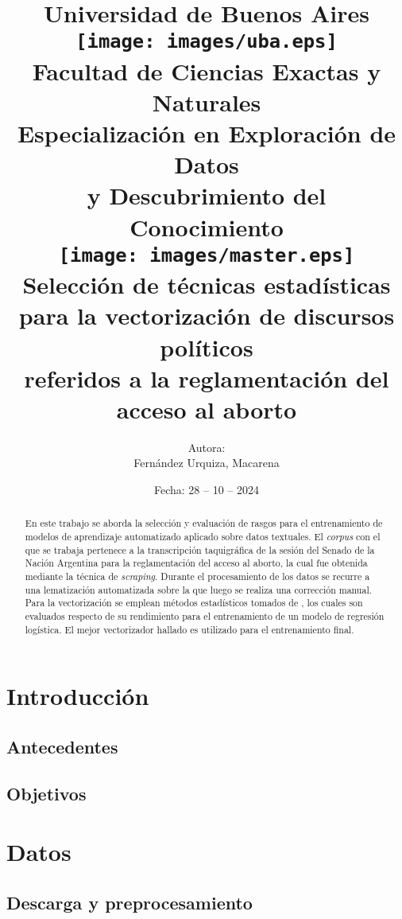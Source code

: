 \documentclass[colorinlistoftodos]{article}
\title{
    {\large Universidad de Buenos Aires\vspace{20pt}}\\
    {\texttt{[image: images/uba.eps]}}\\
    {\large\textbf{Facultad de Ciencias Exactas y Naturales}}\vspace{16pt}\\
    {\small\textbf{Especializaci\'on en Exploraci\'on de Datos\\y Descubrimiento del Conocimiento}\vspace{16pt}}\\
    {\texttt{[image: images/master.eps]}}\\
    {
        Selecci\'on de t\'ecnicas estad\'isticas\\
        para la vectorizaci\'on de discursos pol\'iticos\\
        referidos a la reglamentaci\'on del acceso al aborto
    }
}
\author{Autora:\\Fern\'andez Urquiza, Macarena}
\date{Fecha: 28 -- 10 -- 2024}
\begin{document}
\clearpage\maketitle
\thispagestyle{empty}

\newpage
\tableofcontents

\newpage

\begin{abstract}
En este trabajo se aborda la selecci\'on y evaluaci\'on de rasgos para el
entrenamiento de modelos de aprendizaje automatizado aplicado sobre datos textuales.
El \textit{corpus} con el que se trabaja pertenece a la transcripci\'on taquigr\'afica
de la sesi\'on del Senado de la Naci\'on Argentina para la reglamentaci\'on del acceso
al aborto, la cual fue obtenida mediante la t\'ecnica de \textit{scraping}. Durante el
procesamiento de los datos se recurre a una lematizaci\'on automatizada sobre la que
luego se realiza una correcci\'on manual. Para la vectorizaci\'on se emplean
m\'etodos estad\'isticos tomados de \cite{monroe2008fightin}, los cuales son
evaluados respecto de su rendimiento para el entrenamiento de un modelo de
regresi\'on log\'istica. El mejor vectorizador hallado es utilizado para el
entrenamiento final.
\end{abstract}

\newpage

\section{Introducci\'on}\label{section-intro}

\subsection{Antecedentes}\label{subsection-intro-background}


\subsection{Objetivos}\label{subsection-intro-objectives}



\section{Datos}\label{section-data}

\subsection{Descarga y preprocesamiento}\label{subsection-data-preprocessing}

\end{document}
